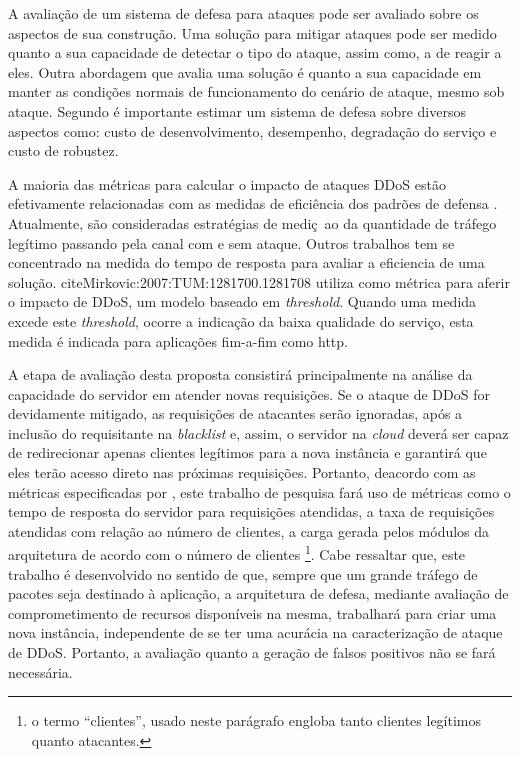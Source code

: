 
A avaliação de um sistema de defesa para ataques pode ser avaliado sobre os aspectos de sua construção. Uma solução para mitigar ataques pode ser medido quanto a sua capacidade de detectar o tipo do ataque, assim como, a de reagir a eles. Outra abordagem que avalia uma solução é quanto a sua capacidade em manter as condições normais de funcionamento do cenário de ataque, mesmo sob ataque. Segundo \cite{4600003} é importante estimar um sistema de defesa sobre diversos aspectos como: custo de desenvolvimento, desempenho, degradação do serviço e custo de robustez. 

A maioria das métricas para calcular o impacto de ataques DDoS estão efetivamente relacionadas com as medidas de eficiência dos padrões de defensa \cite{4809152}. Atualmente, são consideradas estratégias de mediç~ao da quantidade de tráfego legítimo passando pela canal com e sem ataque. Outros trabalhos tem se concentrado na medida do tempo de resposta para avaliar a eficiencia de uma solução. cite{Mirkovic:2007:TUM:1281700.1281708} utiliza como métrica para aferir o impacto de DDoS, um modelo baseado em \emph{threshold}. Quando uma medida excede este \emph{threshold}, ocorre a  indicação da baixa qualidade do serviço, esta medida é indicada para aplicações fim-a-fim como http.


A etapa de avaliação desta proposta consistirá principalmente na análise
da capacidade do servidor em atender novas requisições. Se o ataque de DDoS for devidamente
mitigado, as requisições de atacantes serão ignoradas, após a inclusão do requisitante na \emph{blacklist}
e, assim, o servidor na \emph{cloud} deverá ser capaz de redirecionar apenas clientes legítimos 
para a nova instância e garantirá que eles terão acesso direto nas próximas requisições. %
Portanto, deacordo com as métricas especificadas por \cite{4600003}, este trabalho de pesquisa fará uso de métricas como o tempo de resposta do servidor para requisições atendidas, a taxa de requisições atendidas com relação ao número de clientes, a carga gerada pelos módulos da arquitetura de acordo com o número de clientes \footnote{o termo ``clientes'', usado neste parágrafo engloba tanto clientes legítimos quanto atacantes.}. Cabe ressaltar que, este trabalho é desenvolvido no sentido de que, sempre que um grande tráfego de pacotes seja destinado à aplicação, a arquitetura de defesa, mediante avaliação de comprometimento de recursos disponíveis na mesma, trabalhará para criar uma nova instância, independente de se ter uma acurácia  na caracterização de ataque de DDoS. Portanto, a avaliação quanto a geração de falsos positivos não se fará necessária.
